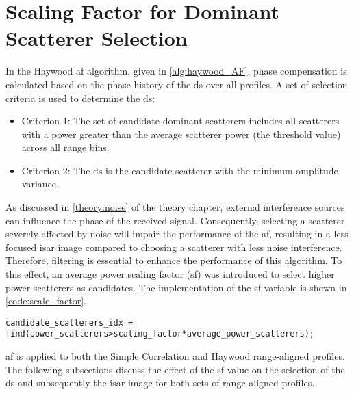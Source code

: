\documentclass[class=report,11pt,crop=false]{standalone}
\begin{document}
    
\section{Scaling Factor for Dominant Scatterer Selection \label{apndxA:scale_factor_effect}}
In the Haywood \gls{af} algorithm, given in \autoref{alg:haywood_AF}, phase compensation is calculated based on the phase history of the \gls{ds} over all profiles. A set of selection criteria is used to determine the \gls{ds}:
\begin{itemize}
    \item Criterion 1: The set of candidate dominant scatterers includes all scatterers with a power greater than the average scatterer power (the threshold value) across all range bins.
    \item Criterion 2: The \gls{ds} is the candidate scatterer with the minimum amplitude variance.
\end{itemize}
As discussed in \autoref{theory:noise} of the theory chapter, external interference sources can influence the phase of the received signal. Consequently, selecting a scatterer severely affected by noise will impair the performance of the \gls{af}, resulting in a less focused \gls{isar} image compared to choosing a scatterer with less noise interference. Therefore, filtering is essential to enhance the performance of this algorithm. To this effect, an average power scaling factor (sf) was introduced to select higher power scatterers as candidates. 
The implementation of the sf variable is shown in \autoref{code:scale_factor}.
\begin{lstlisting}[caption={\textsc{Matlab} code for selecting candidate dominant scatterers.},label={code:scale_factor}]
candidate_scatterers_idx = find(power_scatterers>scaling_factor*average_power_scatterers);
\end{lstlisting}
\gls{af} is applied to both the Simple Correlation and Haywood range-aligned profiles. The following subsections discuss the effect of the sf value on the selection of the \gls{ds} and subsequently the \gls{isar} image for both sets of range-aligned profiles.
\end{document}
